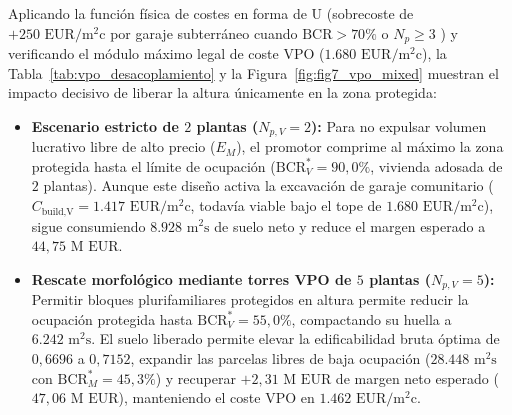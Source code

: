 Aplicando la función física de costes en forma de U (sobrecoste de $+250\text{ EUR}/\text{m}^2\text{c}$ por garaje subterráneo cuando $\text{BCR} > 70\%$ o $N_p \ge 3$ \cite{cte2006}) y verificando el módulo máximo legal de coste VPO ($1.680\text{ EUR}/\text{m}^2\text{c}$), la Tabla~\ref{tab:vpo_desacoplamiento} y la Figura~\ref{fig:fig7_vpo_mixed} muestran el impacto decisivo de liberar la altura únicamente en la zona protegida:

\begin{itemize}
  \item \textbf{Escenario estricto de $2$ plantas ($N_{p,V} = 2$):} Para no expulsar volumen lucrativo libre de alto precio ($E_M$), el promotor comprime al máximo la zona protegida hasta el límite de ocupación ($\text{BCR}_V^* = 90{,}0\%$, vivienda adosada de $2$ plantas). Aunque este diseño activa la excavación de garaje comunitario ($C_{\text{build,V}} = 1.417\text{ EUR}/\text{m}^2\text{c}$, todavía viable bajo el tope de $1.680\text{ EUR}/\text{m}^2\text{c}$), sigue consumiendo $8.928\text{ m}^2\text{s}$ de suelo neto y reduce el margen esperado a $44{,}75\text{ M EUR}$.
  \item \textbf{Rescate morfológico mediante torres VPO de $5$ plantas ($N_{p,V} = 5$):} Permitir bloques plurifamiliares protegidos en altura permite reducir la ocupación protegida hasta $\text{BCR}_V^* = 55{,}0\%$, compactando su huella a $6.242\text{ m}^2\text{s}$. El suelo liberado permite elevar la edificabilidad bruta óptima de $0{,}6696$ a $0{,}7152$, expandir las parcelas libres de baja ocupación ($28.448\text{ m}^2\text{s}$ con $\text{BCR}_M^* = 45{,}3\%$) y recuperar \textbf{$+2{,}31\text{ M EUR}$} de margen neto esperado ($47{,}06\text{ M EUR}$), manteniendo el coste VPO en $1.462\text{ EUR}/\text{m}^2\text{c}$.
\end{itemize}

\begin{table}[htbp]
  \centering
  \caption{Optimización económica y ocupación de suelo con reserva VPO desacoplada bajo curva de costes unificada (sector $6\text{ ha}$, tope VPO $1.680\text{ EUR}/\text{m}^2\text{c}$).}
  \label{tab:vpo_desacoplamiento}
\end{table}

